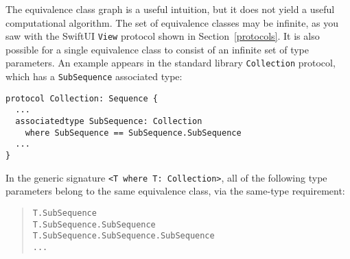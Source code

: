 \documentclass[a4paper,headsepline,bibliography=totoc,toc=flat,fleqn,twoside=semi]{scrbook}
\theoremstyle{definition}
\theoremstyle{definition}
\theoremstyle{definition}
\begin{document}
The equivalence class graph is a useful intuition, but it does not yield a useful computational algorithm. The set of equivalence classes may be infinite, as you saw with the SwiftUI \texttt{View} protocol shown in Section~\ref{protocols}. It is also possible for a single equivalence class to consist of an infinite set of type parameters. An example appears in the standard library \texttt{Collection} protocol, which has a \texttt{SubSequence} associated type:
\begin{Verbatim}
protocol Collection: Sequence {
  ...
  associatedtype SubSequence: Collection
    where SubSequence == SubSequence.SubSequence
  ...
}
\end{Verbatim}
In the generic signature \verb|<T where T: Collection>|, all of the following type parameters belong to the same equivalence class, via the same-type requirement:
\begin{quote}
\begin{verbatim}
T.SubSequence
T.SubSequence.SubSequence
T.SubSequence.SubSequence.SubSequence
...
\end{verbatim}
\end{quote}
\end{document}
